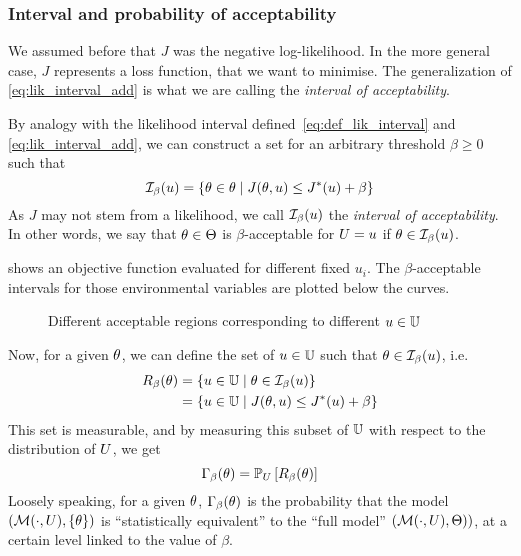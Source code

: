 \documentclass[../../Main_ManuscritThese.tex]{subfiles}
\newcommand\imgpath{/home/victor/acadwriting/Manuscrit/Text/Chapter3/img/}
\begin{document}
  
  \subsubsection{Interval and probability of acceptability}
     \label{ssec:general_cost_prob}
     We assumed before that $J$ was the negative log-likelihood. In
     the more general case, $J$ represents a loss function, that we
     want to minimise. The generalization of
     \cref{eq:lik_interval_add} is what we are calling the
     \emph{interval of acceptability}.
  \begin{definition}
    By analogy with the likelihood interval
    defined~\cref{eq:def_lik_interval} and \cref{eq:lik_interval_add},
    we can construct a set for an arbitrary threshold $\beta \geq 0$
    such that
  \begin{equation}
    \mathcal{I}_{\beta}(u) = \left\{\theta \in \theta \mid J(\theta,u) \leq J^*(u) + \beta \right\}
  \end{equation}
  As $J$ may not stem from a likelihood, we call
  $\mathcal{I}_{\beta}(u)$ the \emph{interval of acceptability}. In
  other words, we say that $\theta\in \Theta$ is $\beta$-acceptable for
  $U=u$ if $\theta \in \mathcal{I}_{\beta}(u)$.
\end{definition}

 shows an objective function
evaluated for different fixed $u_i$. The $\beta$-acceptable intervals
for those environmental variables are plotted below the curves.
\begin{figure}[ht]
  \centering
  
  \caption{\label{fig:lik_interval_threshold} Different acceptable regions corresponding to different $u \in \mathbb{U}$}
\end{figure}

Now, for a given $\theta$, we can define the set of $u\in \mathbb{U}$ such
that $\theta \in \mathcal{I}_{\beta}(u)$, i.e.\
  \begin{align}
    R_{\beta}(\theta) &= \left\{u\in \mathbb{U} \mid \theta \in \mathcal{I}_{\beta}(u) \right\} \\
           &= \left\{u\in \mathbb{U} \mid J(\theta, u)  \leq J^*(u) + \beta \right\}
  \end{align}
  This set is measurable, and by measuring this subset of $\mathbb{U}$
  with respect to the distribution of $U$, we get
  \begin{equation}
    \label{eq:def_gamma_additive}
    \Gamma_\beta(\theta) = \mathbb{P}_U\left[R_{\beta}(\theta)\right]
  \end{equation}
  Loosely speaking, for a given $\theta$, $\Gamma_{\beta}(\theta)$ is the
  probability that the model $(\mathcal{M}(\cdot, U), \{\theta\})$ is
  ``statistically equivalent'' to the ``full model''
  $\left(\mathcal{M}(\cdot, U), \Theta)\right)$, at a certain level
  linked to the value of $\beta$.
\end{document}
